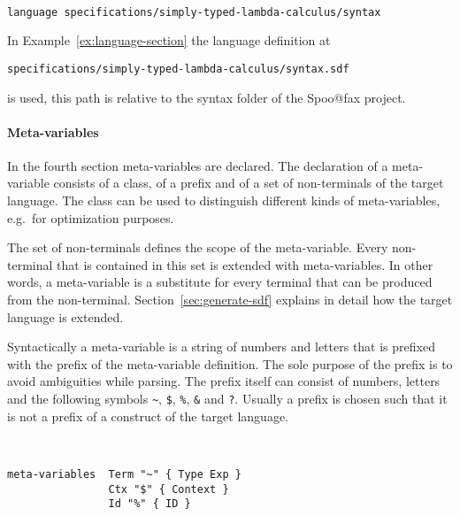 \begin{example}{~}
\begin{verbatim}
language specifications/simply-typed-lambda-calculus/syntax
\end{verbatim}
\label{ex:language-section}
\end{example}

In Example~\ref{ex:language-section} the language definition at
\begin{verbatim}
specifications/simply-typed-lambda-calculus/syntax.sdf
\end{verbatim}

is used, this path is relative to the syntax folder of the Spoo@fax
project.

\paragraph{Meta-variables} In the fourth section meta-variables are
declared. The declaration of a meta-variable consists of a class, of a
prefix and of a set of non-terminals of the target language. The class
can be used to distinguish different kinds of meta-variables, e.g.\
for optimization purposes. 

The set of non-terminals defines the scope of the meta-variable. Every
non-terminal that is contained in this set is extended with
meta-variables. In other words, a meta-variable is a substitute for
every terminal that can be produced from the
non-terminal. Section~\ref{sec:generate-sdf} explains in detail how
the target language is extended.

Syntactically a meta-variable is a string of numbers and letters that
is prefixed with the prefix of the meta-variable definition. The sole
purpose of the prefix is to avoid ambiguities while parsing. The
prefix itself can consist of numbers, letters and the following
symbols \verb|~|, \verb|$|, \verb|%|, \verb|&| and \verb|?|.
 Usually a prefix is chosen such that it
is not a prefix of a construct of the target language.

\begin{example}{~}
\begin{verbatim}
meta-variables 	Term "~" { Type Exp }
                Ctx "$" { Context }
                Id "%" { ID }
\end{verbatim}
\label{ex:meta-variable-section}
\end{example}


